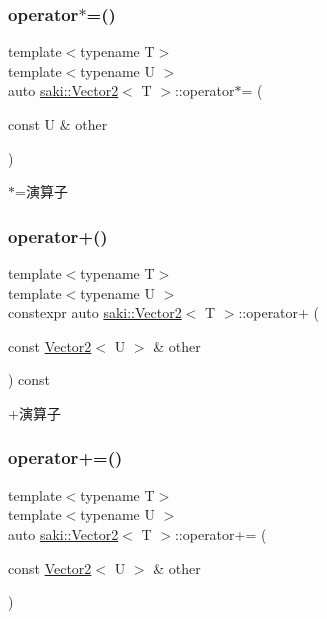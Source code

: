 \subsubsection{\texorpdfstring{operator$\ast$=()}{operator*=()}}
{\footnotesize\ttfamily template$<$typename T$>$ \\
template$<$typename U $>$ \\
auto \mbox{\hyperlink{classsaki_1_1_vector2}{saki\+::\+Vector2}}$<$ T $>$\+::operator$\ast$= (\begin{DoxyParamCaption}\item[{const U \&}]{other }\end{DoxyParamCaption})\hspace{0.3cm}{\ttfamily [inline]}}



$\ast$=演算子 

\mbox{\label{classsaki_1_1_vector2_a858afb6fe807d543ca5b266404226cd5}} 
\subsubsection{\texorpdfstring{operator+()}{operator+()}}
{\footnotesize\ttfamily template$<$typename T$>$ \\
template$<$typename U $>$ \\
constexpr auto \mbox{\hyperlink{classsaki_1_1_vector2}{saki\+::\+Vector2}}$<$ T $>$\+::operator+ (\begin{DoxyParamCaption}\item[{const \mbox{\hyperlink{classsaki_1_1_vector2}{Vector2}}$<$ U $>$ \&}]{other }\end{DoxyParamCaption}) const\hspace{0.3cm}{\ttfamily [inline]}}



+演算子 

\mbox{\label{classsaki_1_1_vector2_aa76ccb2d2228441d510dca7781f785d3}} 
\subsubsection{\texorpdfstring{operator+=()}{operator+=()}}
{\footnotesize\ttfamily template$<$typename T$>$ \\
template$<$typename U $>$ \\
auto \mbox{\hyperlink{classsaki_1_1_vector2}{saki\+::\+Vector2}}$<$ T $>$\+::operator+= (\begin{DoxyParamCaption}\item[{const \mbox{\hyperlink{classsaki_1_1_vector2}{Vector2}}$<$ U $>$ \&}]{other }\end{DoxyParamCaption})\hspace{0.3cm}{\ttfamily [inline]}}



